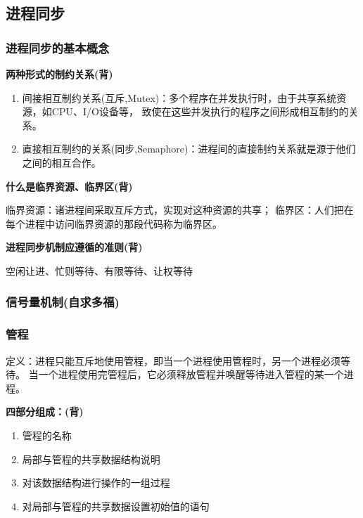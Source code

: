 \documentclass{article}
\begin{document}
\subsection{进程同步}
\subsubsection{{\color{red}进程同步的基本概念}}
\noindent\textbf{两种形式的制约关系{\color{green}(背)}}
\begin{enumerate}
    \item 间接相互制约关系(互斥,Mutex)：多个程序在并发执行时，由于共享系统资源，如CPU、I/O设备等，
    致使在这些并发执行的程序之间形成相互制约的关系。
    \item 直接相互制约的关系(同步,Semaphore)：进程间的直接制约关系就是源于他们之间的相互合作。
\end{enumerate}
\textbf{什么是临界资源、临界区{\color{green}(背)}}

临界资源：诸进程间采取互斥方式，实现对这种资源的共享；
临界区：人们把在每个进程中访问临界资源的那段代码称为临界区。

\noindent \textbf{进程同步机制应遵循的准则{\color{green}(背)}}

空闲让进、忙则等待、有限等待、让权等待
\vspace*{-0.2cm}
\subsubsection{{\color{red}信号量机制(自求多福)}}
\vspace*{-0.2cm}
\subsubsection{{\color{red}管程}}
定义：进程只能互斥地使用管程，即当一个进程使用管程时，另一个进程必须等待。
当一个进程使用完管程后，它必须释放管程并唤醒等待进入管程的某一个进程。

\vspace*{0.2cm}
\noindent\textbf{四部分组成：{\color{green}(背)}}
\vspace*{-0.2cm}
\begin{enumerate}
    \item 管程的名称
    \item 局部与管程的共享数据结构说明
    \item 对该数据结构进行操作的一组过程
    \item 对局部与管程的共享数据设置初始值的语句
\end{enumerate}
\end{document}
